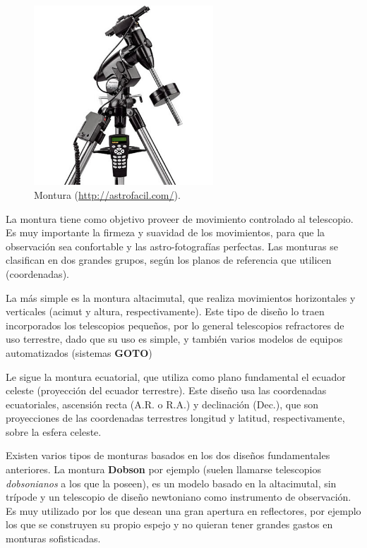 \bigskip
\begin{figure}[!ht]
  \begin{center}
  \includegraphics[width=0.6\textwidth]{../images/montura.jpg}
  \caption{Montura (\href{http://astrofacil.com/}{http://astrofacil.com/}).}
  \label{fig:diag_scrum}
  \end{center}
\end{figure}

\bigskip
La montura tiene como objetivo proveer de movimiento controlado al telescopio. Es muy importante la firmeza y suavidad de los movimientos, para que la observación sea confortable y las astro-fotografías perfectas. Las monturas se clasifican en dos grandes grupos, según los planos de referencia que utilicen (coordenadas).

\bigskip
La más simple es la montura altacimutal, que realiza movimientos horizontales y verticales (acimut y altura, respectivamente). Este tipo de diseño lo traen incorporados los telescopios pequeños, por lo general telescopios refractores de uso terrestre, dado que su uso es simple, y también varios modelos de equipos automatizados (sistemas \textbf{GOTO})

\bigskip
Le sigue la montura ecuatorial, que utiliza como plano fundamental el ecuador celeste (proyección del ecuador terrestre). Este diseño usa las coordenadas ecuatoriales, ascensión recta (A.R. o R.A.) y declinación (Dec.), que son proyecciones de las coordenadas terrestres longitud y latitud, respectivamente, sobre la esfera celeste.

\bigskip
Existen varios tipos de monturas basados en los dos diseños fundamentales anteriores. La montura \textbf{Dobson} por ejemplo (suelen llamarse telescopios \textit{dobsonianos} a los que la poseen), es un modelo basado en la altacimutal, sin trípode y un telescopio de diseño newtoniano como instrumento de observación. Es muy utilizado por los que desean una gran apertura en reflectores, por ejemplo los que se construyen su propio espejo y no quieran tener grandes gastos en monturas sofisticadas.

